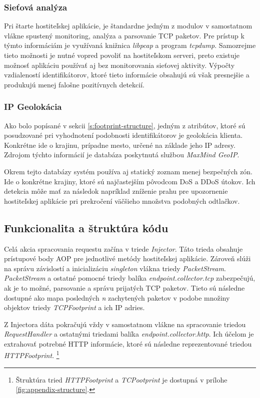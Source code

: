 \documentclass[
  printed, %
  table,   %
  lof,     %
  nolot,   %
  nocover
]{fithesis3}
\begin{document}
\subsubsection{Sieťová analýza}
Pri štarte hostiteľskej aplikácie, je štandardne jedným z modulov v samostatnom
vlákne spustený monitoring, analýza a parsovanie TCP paketov. Pre prístup k
týmto informáciám je využívaná knižnica \textit{libpcap} a program
\textit{tcpdump}. Samozrejme tieto možnosti je nutné vopred povoliť na
hostiteľskom serveri, preto existuje možnosť aplikáciu používať aj bez
monitorovania sieťovej aktivity. Výpočty vzdialeností identifikátorov, ktoré
tieto informácie obsahujú sú však presnejšie a produkujú menej falošne
pozitívnych detekcií.

\subsubsection{IP Geolokácia}
Ako bolo popísané v sekcii \ref{s:footprint-structure}, jedným z atribútov, ktoré sú posudzované pri
vyhodnotení podobnosti identifikátorov je geolokácia klienta. Konkrétne ide o
krajinu, prípadne mesto, určené na základe jeho IP adresy. Zdrojom týchto
informácií je databáza poskytnutá službou \textit{MaxMind GeoIP}.

Okrem tejto databázy systém používa aj statický zoznam menej bezpečných zón.
Ide o konkrétne krajiny, ktoré sú najčastejším pôvodcom DoS a DDoS útokov. Ich
detekcia môže mať za následok napríklad zníženie prahu pre upozornenie
hostiteľskej aplikácie pri prekročení väčšieho množstva podobných odtlačkov.

\subsection{Funkcionalita a štruktúra kódu}
Celá akcia spracovania requestu začína v triede \textit{Injector}. Táto trieda
obsahuje prístupové body AOP pre jednotlivé metódy hostiteľskej aplikácie.
Zároveň slúži na správu závislostí a inicializáciu \textit{singleton} vlákna
triedy \textit{PacketStream}. \textit{PacketStream} a ostatné pomocné triedy
balíka \textit{endpoint.collector.tcp} zabezpečujú, ak je to možné, parsovanie a 
správu prijatých TCP paketov. Tieto sú následne dostupné ako mapa posledných
\textit{n} zachytených paketov v podobe množiny objektov triedy \textit{TCPFootprint} a ich IP
adries.

Z Injectora dáta pokračujú vždy v samostatnom vlákne na spracovanie triedou
\textit{RequestHandler} a ostatnými triedami balíka
\textit{endpoint.collector.http}. Ich účelom je extrahovať potrebné HTTP
informácie, ktoré sú následne reprezentované triedou \textit{HTTPFootprint}.
\footnote{Štruktúra tried \textit{HTTPFootprint} a \textit{TCPootprint} je dostupná v
prílohe \ref{fig:appendix-structure}.}
\end{document}
